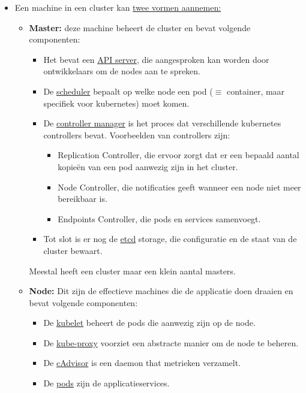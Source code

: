 \documentclass{report}
\begin{document}
	\begin{itemize}
		\item[\info] Een machine in een cluster kan \underline{twee vormen aannemen:}
		\begin{itemize}
			\item[\info] \textbf{Master:} deze machine beheert de cluster en bevat volgende componenten:
			\begin{itemize}
				\item Het bevat een \underline{API server}, die aangesproken kan worden door ontwikkelaars om de nodes aan te spreken.
				\item De \underline{scheduler} bepaalt op welke node een pod ($\equiv$ container, maar specifiek voor kubernetes) moet komen.
				\item De \underline{controller manager} is het proces dat verschillende kubernetes controllers bevat. Voorbeelden van controllers zijn:
				\begin{itemize}
					\item Replication Controller, die ervoor zorgt dat er een bepaald aantal kopieën van een pod aanwezig zijn in het cluster.
					\item Node Controller, die notificaties geeft wanneer een node niet meer bereikbaar is.
					\item Endpoints Controller, die pods en services samenvoegt.
				\end{itemize}
				\item Tot slot is er nog de \underline{etcd} storage, die configuratie en de staat van de cluster bewaart.
			\end{itemize}

			Meestal heeft een cluster maar een klein aantal masters.
			\item[\info] \textbf{Node:} Dit zijn de effectieve machines die de applicatie doen draaien en bevat volgende componenten:
			\begin{itemize}
				\item De \underline{kubelet} beheert de pods die aanwezig zijn op de node.
				\item De \underline{kube-proxy} voorziet een abstracte manier om de node te beheren.
				\item De \underline{cAdvisor} is een daemon that metrieken verzamelt.
				\item De \underline{pods} zijn de applicatieservices. 
			\end{itemize}
		\end{itemize}


\end{itemize}
\end{document}

